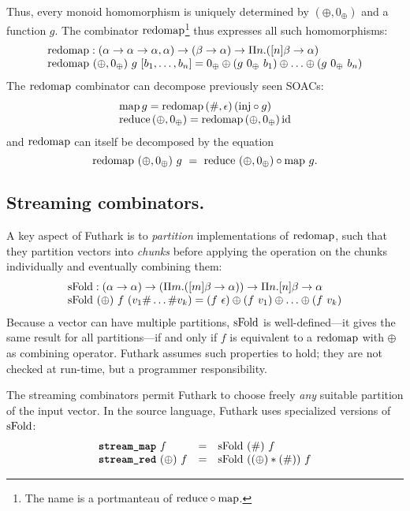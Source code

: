 Thus, every monoid homomorphism is uniquely determined by
$(\oplus,0_{\oplus})$ and a function $g$.  The combinator $\mathrm{redomap}$\footnote{The name is a portmanteau of $\mathrm{reduce} \circ \mathrm{map}$.}
thus expresses all such homomorphisms:
\[ \begin{array}{l}
\mathrm{redomap} : (\alpha \to \alpha \to \alpha, \alpha) \to (\beta \to \alpha) \to \Pi n. ([n]\beta \to \alpha) \\
\mathrm{redomap}~(\oplus, 0_{\oplus})~g~[b_1, \ldots, b_n] = 0_{\oplus} \oplus (g~0_{\oplus}~b_1) \oplus \ldots \oplus (g~0_{\oplus}~b_n)
\end{array} \]
The $\mathrm{redomap}$ combinator can decompose previously seen SOACs:
\[ \begin{array}{l}
\mathrm{map} \, g = \mathrm{redomap}\, (\#, \epsilon)\, (\mathrm{inj} \circ g) \\
\mathrm{reduce}\, (\oplus, 0_{\oplus}) = \mathrm{redomap}\, (\oplus, 0_{\oplus})\, \mathrm{id}
\end{array} \]
and $\mathrm{redomap}$ can itself be decomposed by the equation
\[
  \mathrm{redomap} ~ (\oplus,0_{\oplus}) ~ g ~ = ~ \mathrm{reduce} ~ (\oplus,0_{\oplus}) \circ \mathrm{map} ~ g.
\]

\subsection{Streaming combinators.}

A key aspect of Futhark is to \emph{partition} implementations of
$\mathrm{redomap}$, such that they partition vectors into \emph{chunks}
before applying the operation on the chunks individually and
eventually combining them:
\[ \begin{array}{l}
\mathrm{sFold} : (\alpha \to \alpha) \to (\Pi m. ([m]\beta \to \alpha)) \to \Pi n. [n]\beta \to \alpha \\
\mathrm{sFold}~(\oplus)~f~(v_1 \# \ldots \# v_k) = (f~\epsilon) \oplus (f~v_1) \oplus \ldots \oplus (f~v_k) \\
\end{array} \]
%
Because a vector can have multiple partitions, $\mathrm{sFold}$ is
well-defined---it gives the same result for all partitions---if and
only if $f$ is equivalent to a $\mathrm{redomap}$ with $\oplus$ as combining
operator.  Futhark assumes such properties to hold; they are not
checked at run-time, but a programmer responsibility.

The streaming combinators permit Futhark to choose freely \emph{any}
suitable partition of the input vector.  In the source language, Futhark uses specialized
versions of $\mathrm{sFold}$:
\[
  \begin{array}{lcl}
    \mbox{\texttt{\bfseries{stream\_map}}}~f & = &  \mathrm{sFold}~(\#)~f \\
    \mbox{\texttt{\bfseries{stream\_red}}}~(\oplus)~f & = & \mathrm{sFold}~((\oplus) * (\#))~f
  \end{array}
\]

